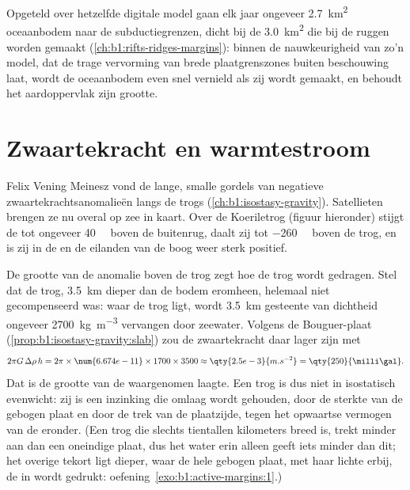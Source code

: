 Opgeteld over hetzelfde digitale model gaan elk jaar ongeveer \qty{2.7}{km^2} oceaanbodem naar de subductiegrenzen, dicht bij de \qty{3.0}{km^2} die bij de ruggen worden gemaakt (\cref{ch:b1:rifts-ridges-margins}): binnen de nauwkeurigheid van zo'n model, dat de trage vervorming van brede plaatgrenszones buiten beschouwing laat, wordt de oceaanbodem even snel vernield als zij wordt gemaakt, en behoudt het aardoppervlak zijn grootte.

\section{Zwaartekracht en warmtestroom}\label{sec:b1:active-margins:gravity-heat}

Felix Vening Meinesz vond de lange, smalle gordels van negatieve zwaartekrachtsanomalieën langs de trogs (\cref{ch:b1:isostasy-gravity}). Satellieten brengen ze nu overal op zee in kaart. Over de Koeriletrog (figuur hieronder) stijgt de  tot ongeveer \qty{40}{\milli\gal} boven de buitenrug, daalt zij tot \qty{-260}{\milli\gal} boven de trog, en is zij in de  en de eilanden van de boog weer sterk positief.

De grootte van de anomalie boven de trog zegt hoe de trog wordt gedragen. Stel dat de trog, \qty{3.5}{km} dieper dan de bodem eromheen, helemaal niet gecompenseerd was: waar de trog ligt, wordt \qty{3.5}{km} gesteente van dichtheid ongeveer \qty{2700}{kg.m^{-3}} vervangen door zeewater. Volgens de Bouguer-plaat (\cref{prop:b1:isostasy-gravity:slab}) zou de zwaartekracht daar lager zijn met
\[
  2\pi G\,\Delta\rho\,h = 2\pi \times \num{6.674e-11} \times 1700 \times 3500
  \approx \qty{2.5e-3}{m.s^{-2}} = \qty{250}{\milli\gal} .
\]
Dat is de grootte van de waargenomen laagte. Een trog is dus niet in isostatisch evenwicht: zij is een inzinking die omlaag wordt gehouden, door de sterkte van de gebogen plaat en door de trek van de plaatzijde, tegen het opwaartse vermogen van de  eronder. (Een trog die slechts tientallen kilometers breed is, trekt minder aan dan een oneindige plaat, dus het water erin alleen geeft iets minder dan dit; het overige tekort ligt dieper, waar de hele gebogen plaat, met haar lichte  erbij, de  in wordt gedrukt: oefening~\ref{exo:b1:active-margins:1}.)

